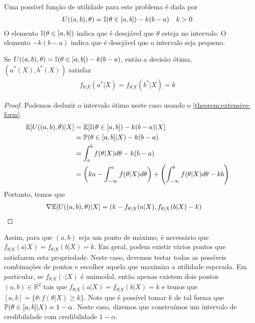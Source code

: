Uma possível função de utilidade para 
este problema é dada por
\begin{align*}
 U((a,b),\theta)
 &= \I(\theta \in [a,b]) -k(b-a)
 & k > 0
\end{align*}
O elemento $\I(\theta \in [a,b])$ indica que 
é desejável que $\theta$ esteja no intervalo.
O elemento $-k(b-a)$ indica que 
é desejável que o intervalo seja pequeno.
\begin{theorem}
 \label{thm:credible_interval_1}
 Se $U((a,b),\theta) = \I(\theta \in [a,b]) -k(b-a)$,
 então a decisão ótima, $(a^{*}(X),b^{*}(X))$ satisfaz
 \begin{align*}
  f_{\theta|X}(a^{*}|X)
  =f_{\theta|X}(b^{*}|X) = k
 \end{align*}
\end{theorem}
\begin{proof}
 Podemos deduzir o intervalo ótimo neste caso 
 usando o \cref{theorem:extensive-form}. 
 \begin{align*}
  \E[U((a,b),\theta)|X]	
  &= \E[\I(\theta \in [a,b]) -k(b-a)|X] \\
  &= \P(\theta \in [a,b]|X) -k(b-a) \\
  &= \int_{a}^{b}{f(\theta|X)d\theta} -k(b-a) \\
  &= \left(ka-\int_{-\infty}^{a}{f(\theta|X)d\theta}\right) 
  +\left(\int_{-\infty}^{b}{f(\theta|X)d\theta}-kb\right)
 \end{align*}
 Portanto, temos que
 \begin{align*}
  \nabla \E[U((a,b),\theta)|X]
  &= (k-f_{\theta|X}(a|X), f_{\theta|X}(b|X)-k)
 \end{align*}
\end{proof}
Assim, para que $(a,b)$ seja um ponto de máximo,
é necessário que
$f_{\theta|X}(a|X) = f_{\theta|X}(b|X) = k$.
Em geral, podem existir vários pontos que 
satisfazem esta propriedade.
Neste caso, devemos testar 
todas as possíveis combinações de pontos
e escolher aquela que maximiza a utilidade esperada.
Em particular, se $f_{\theta|X}(\cdot|X)$ é unimodal, 
então apenas existem dois pontos 
$(a,b) \in \mathbb{R}^{2}$ tais que 
$f_{\theta|X}(a|X) = f_{\theta|X}(b|X) = k$ e temos que
$[a,b] = \{\theta: f(\theta|X) \geq k\}$.
Note que é possível tomar $k$ de tal forma que 
$\P(\theta \in [a,b]|X) = 1-\alpha$.
Neste caso, dizemos que construímos um 
intervalo de credibilidade com 
credibilidade $1-\alpha$.

